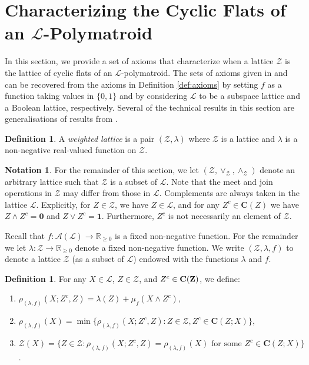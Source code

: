 \documentclass[a4paper,11pt,reqno]{article}
\theoremstyle{definition}
\newtheorem{definition}[theorem]{{{Definition}}}
\newtheorem{notation}[theorem]{{{Notation}}}
\newcommand{\mL}{\mathcal{L}}
\newcommand{\mA}{\mathcal{A}}
\newcommand{\cC}{\textup{\bf{C}}}
\newcommand{\one}{{\mathbf{1}}}
\newcommand{\zero}{{\mathbf{0}}}
\begin{document}
\section{Characterizing the Cyclic Flats of an \texorpdfstring{$\mathcal{L}$}{L}-Polymatroid}\label{sec:main}

In this section, we provide a set of axioms that characterize when a lattice $\mathcal{Z}$ is the lattice of cyclic flats of an $\mL$-polymatroid. The sets of axioms given in \cite{AlfByr22} and \cite{Csirm20} can be recovered from the axioms in Definition \ref{def:axioms} by setting \( f \) as a function taking values in \( \{0,1\} \) and by considering \( \mathcal{L} \) to be a subspace lattice and a Boolean lattice, respectively. Several of the technical results in this section are generalisations of results from \cite[Section 4]{Csirm20}.

\begin{definition}
    A \emph{weighted lattice} is a pair $(\mathcal{Z},\lambda)$ where $\mathcal{Z}$ is a lattice and $\lambda$ is a non-negative real-valued function on $\mathcal{Z}$.
\end{definition}

\begin{notation}
    For the remainder of this section, we let $(\mathcal{Z},\vee_\mathcal{Z},\wedge_\mathcal{Z})$ denote an arbitrary lattice such that $\mathcal{Z}$ is a subset of $\mathcal{L}$. 
    Note that the meet and join operations in $\mathcal{Z}$ may differ from those in $\mathcal{L}$. Complements are always taken in the lattice $\mathcal{L}$. Explicitly, for $Z\in\mathcal{Z}$, we have $Z\in\mathcal{L}$, and for any $Z^c\in\mathbf{C}(Z)$ we have $Z\wedge Z^c=\zero$ and $Z\vee Z^c=\one$. Furthermore, $Z^c$ is not necessarily an element of $\mathcal{Z}$.

    Recall that $f:\mA(\mathcal{L})\rightarrow\mathbb{R}_{\geq0}$ is a fixed non-negative function. For the remainder we let $\lambda:\mathcal{Z}\rightarrow\mathbb{R}_{\geq0}$ denote a fixed non-negative function. We write $(\mathcal{Z},\lambda,f)$ to denote a lattice $\mathcal{Z}$ (as a subset of $\mathcal{L}$) endowed with the functions $\lambda$ and $f$.
\end{notation}

\begin{definition}
    For any $X\in\mathcal{L}$, $Z\in\mathcal{Z}$, and $Z^c \in \cC(Z)$, we define:
    \begin{enumerate}
        \item $\rho_{(\lambda,f)}(X;Z^c,Z) = \lambda(Z) + \mu_f(X\wedge Z^c)$,
        \item $\rho_{(\lambda,f)}(X) = \min\{\rho_{(\lambda,f)}(X;Z^c,Z) : Z\in\mathcal{Z}, Z^c\in \mathbf{C}(Z;X)\},$
        \item $\mathcal{Z}(X) = \{Z\in\mathcal{Z} : \rho_{(\lambda,f)}(X;Z^c,Z) = \rho_{(\lambda,f)}(X) \text{ for some } Z^c \in \mathbf{C}(Z;X) \}$.
    \end{enumerate}
\end{definition}
\end{document}

